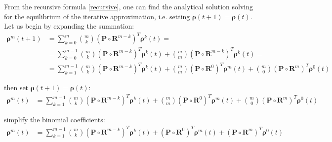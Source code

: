 \documentclass[\main/main.tex]{subfiles}
\begin{document}
From the recursive formula \ref{recursive}, one can find the analytical solution solving for the equilibrium of the iterative approximation, i.e. setting $\bm{\rho}(t+1) = \bm{\rho}(t)$. Let us begin by expanding the summation:
\begin{equation}
\begin{split}
\bm{\rho}^m(t+1) &= \sum_{k=0}^{m} {m \choose k} (\mathbf{P} \circ \mathbf{R}^{m-k}) ^ T \bm{\rho}^k(t) =\\
&= \sum_{k=0}^{m-1} {m \choose k} (\mathbf{P} \circ \mathbf{R}^{m-k}) ^ T \bm{\rho}^k(t) +  {m \choose m} (\mathbf{P} \circ \mathbf{R}^{m-k}) ^ T \bm{\rho}^k(t) =\\
&=  \sum_{k=1}^{m-1} {m \choose k} (\mathbf{P} \circ \mathbf{R}^{m-k}) ^ T \bm{\rho}^k(t) +
     {m \choose m} (\mathbf{P} \circ \mathbf{R}^{0}) ^ T \bm{\rho}^m(t) +  {m \choose 0} (\mathbf{P} \circ \mathbf{R}^{m}) ^ T \bm{\rho}^0(t)
\end{split}
\end{equation}

then set $\bm{\rho}(t+1) = \bm{\rho}(t)$:
\begin{equation}
\begin{split}
\bm{\rho}^m(t) &=  \sum_{k=1}^{m-1} {m \choose k} (\mathbf{P} \circ \mathbf{R}^{m-k}) ^ T \bm{\rho}^k(t) +
     {m \choose m} (\mathbf{P} \circ \mathbf{R}^{0}) ^ T \bm{\rho}^m(t) +  {m \choose 0} (\mathbf{P} \circ \mathbf{R}^{m}) ^ T \bm{\rho}^0(t)
\end{split}
\end{equation}

simplify the binomial coefficients:
\begin{equation}
\begin{split}
\bm{\rho}^m(t) &=  \sum_{k=1}^{m-1} {m \choose k} (\mathbf{P} \circ \mathbf{R}^{m-k}) ^ T \bm{\rho}^k(t) +
     (\mathbf{P} \circ \mathbf{R}^{0}) ^ T \bm{\rho}^m(t) + (\mathbf{P} \circ \mathbf{R}^{m}) ^ T \bm{\rho}^0(t)
\end{split}
\end{equation}
\end{document}
